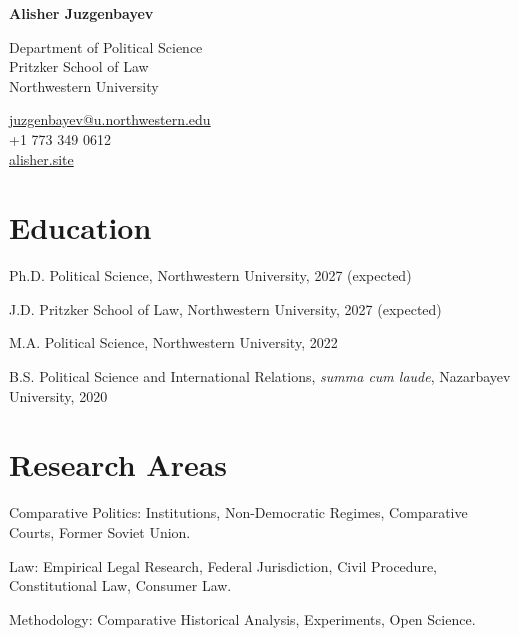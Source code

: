 \documentclass[11pt,letterpaper]{report}
\newcommand{\myname}{Alisher Juzgenbayev}
\newcommand{\namefont}[1]{{\normalfont\bfseries\Huge{#1}}}
\newcommand{\listitemspace}{0.25em}
\renewenvironment{itemize}
{\begin{list}{}{\setlength{\leftmargin}{0em}
                \setlength{\parskip}{0em}
                \setlength{\itemsep}{\listitemspace}
                \setlength{\parsep}{\listitemspace}}}
{\end{list}}
\begin{document}
    \raggedright{}

    \namefont{\myname}

    \vspace{1em}
    \begin{minipage}[t]{0.700\textwidth}
        Department of Political Science \\
        Pritzker School of Law \\
        Northwestern University
    \end{minipage}
    \begin{minipage}[t]{0.295\textwidth}
        \flushright{}
        \href{mailto:juzgenbayev@u.northwestern.edu}{juzgenbayev@u.northwestern.edu} \\
        +1 773 349 0612 \\
        \href{https://alisher.site}{alisher.site}
    \end{minipage}


    \section*{Education}

    \begin{tablist}

        \item[Ph.D.] \tab{}Political Science, Northwestern University, 2027 (expected)
        \item[J.D.] \tab{}Pritzker School of Law, Northwestern University, 2027 (expected)
        \item[M.A.]  \tab{}Political Science, Northwestern University, 2022
        \item[B.S.]  \tab{}Political Science and International Relations, \textit{summa cum laude}, Nazarbayev University, 2020

    \end{tablist}





    \section*{Research Areas}

    \begin{itemize}

        \item Comparative Politics: Institutions, Non-Democratic Regimes, Comparative Courts, Former Soviet Union.
        \item Law: Empirical Legal Research, Federal Jurisdiction, Civil Procedure, Constitutional Law, Consumer Law.
        \item Methodology: Comparative Historical Analysis, Experiments, Open Science. 

    \end{itemize}
\end{document}
